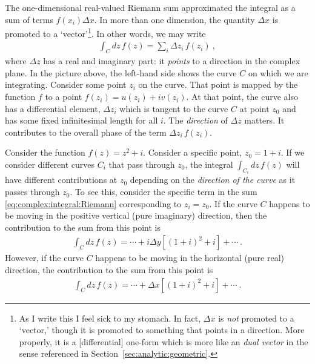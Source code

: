 The one-dimensional real-valued Riemann sum approximated the integral as a sum of terms $f(x_i)\Delta x$. In more than one dimension, the quantity $\Delta x$ is promoted to a `vector'\footnote{As I write this I feel sick to my stomach. In fact, $\Delta x$ is \emph{not} promoted to a `vector,' though it is promoted to something that points in a direction. More properly, it is a [differential] one-form which is more like an \emph{dual vector} in the sense referenced in Section~\ref{sec:analytic:geometric}.}. In other words, we may write
\begin{align}
	\int_C dz\, f(z) = \sum_i \Delta z_i \, f(z_i) \ ,
	\label{eq:complex:integral:Riemann}
\end{align}
where $\Delta z$ has a real and imaginary part: it \emph{points} to a direction in the complex plane. In the picture above, the left-hand side shows the curve $C$ on which we are integrating. Consider some point $z_i$ on the curve. That point is mapped by the function $f$ to a point $f(z_i) = u(z_i)+iv(z_i)$. At that point, the curve also has a differential element, $\Delta z_i$ which is tangent to the curve $C$ at point $z_0$ and has some fixed infinitesimal length for all $i$. The \emph{direction} of $\Delta z$ matters. It contributes to the overall phase of the term $\Delta z_i \, f(z_i)$.
\begin{example}
Consider the function $f(z) = z^2+i$.  Consider a specific point, $z_0 = 1+i$. If we consider different curves $C_i$ that pass through $z_0$, the integral $\int_{C_i}dz\,f(z)$ will have different contributions at $z_0$ depending on the \emph{direction of the curve} as it passes through $z_0$. To see this, consider the specific term in the sum \eqref{eq:complex:integral:Riemann} corresponding to $z_i = z_0$. If the curve $C$ happens to be moving in the positive vertical (pure imaginary) direction, then the contribution to the sum from this point is
\begin{align}
	\int_C dz\, f(z) = \cdots + i\Delta y\left[(1+i)^2 + i\right] + \cdots \ .
\end{align}
However, if the curve $C$ happens to be moving in the horizontal (pure real) direction, the contribution to the sum from this point is
\begin{align}
	\int_C dz\, f(z) = \cdots + \Delta x\left[(1+i)^2 + i\right] + \cdots \ .
\end{align}
\end{example}
